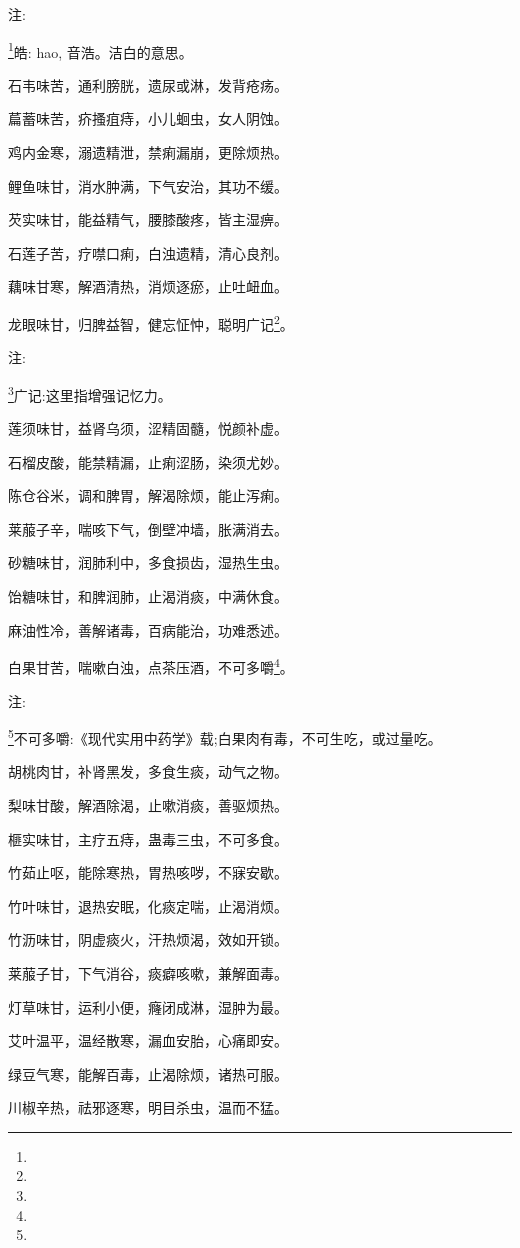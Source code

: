 \documentclass[a4paper,12pt,UTF8,twoside]{ctexbook}
\begin{document}
注:

\footnote{}皓: hao, 音浩。洁白的意思。

石韦味苦，通利膀胱，遗尿或淋，发背疮疡。

萹蓄味苦，疥搔疽痔，小儿蛔虫，女人阴蚀。

鸡内金寒，溺遗精泄，禁痢漏崩，更除烦热。

鲤鱼味甘，消水肿满，下气安治，其功不缓。

芡实味甘，能益精气，腰膝酸疼，皆主湿痹。

石莲子苦，疗噤口痢，白浊遗精，清心良剂。

藕味甘寒，解酒清热，消烦逐瘀，止吐衄血。

龙眼味甘，归脾益智，健忘怔忡，聪明广记\footnote{}。

注:

\footnote{}广记:这里指增强记忆力。

莲须味甘，益肾乌须，涩精固髓，悦颜补虚。

石榴皮酸，能禁精漏，止痢涩肠，染须尤妙。

陈仓谷米，调和脾胃，解渴除烦，能止泻痢。

莱菔子辛，喘咳下气，倒壁冲墙，胀满消去。

砂糖味甘，润肺利中，多食损齿，湿热生虫。

饴糖味甘，和脾润肺，止渴消痰，中满休食。

麻油性冷，善解诸毒，百病能治，功难悉述。

白果甘苦，喘嗽白浊，点茶压酒，不可多嚼\footnote{}。

注:

\footnote{}不可多嚼:《现代实用中药学》载;白果肉有毒，不可生吃，或过量吃。

胡桃肉甘，补肾黑发，多食生痰，动气之物。

梨味甘酸，解酒除渴，止嗽消痰，善驱烦热。

榧实味甘，主疗五痔，蛊毒三虫，不可多食。

竹茹止呕，能除寒热，胃热咳哕，不寐安歇。

竹叶味甘，退热安眠，化痰定喘，止渴消烦。

竹沥味甘，阴虚痰火，汗热烦渴，效如开锁。

莱菔子甘，下气消谷，痰癖咳嗽，兼解面毒。

灯草味甘，运利小便，癃闭成淋，湿肿为最。

艾叶温平，温经散寒，漏血安胎，心痛即安。

绿豆气寒，能解百毒，止渴除烦，诸热可服。

川椒辛热，祛邪逐寒，明目杀虫，温而不猛。
\end{document}
